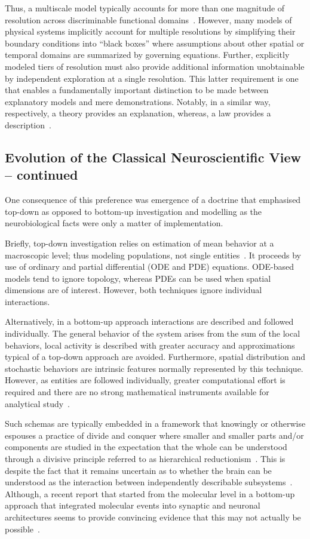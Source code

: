 \documentclass[11pt,3p,twocolumn]{JMN}
\begin{document}
Thus, a multiscale model typically accounts for more than one magnitude of resolution across discriminable functional domains~\citep{walpole13}. However, many models of physical systems implicitly account for multiple resolutions by simplifying their boundary conditions into “black boxes” where assumptions about other spatial or temporal domains are summarized by governing equations. Further, explicitly modeled tiers of resolution must also provide additional information unobtainable by independent exploration at a single resolution. This latter requirement is one that enables a fundamentally important distinction to be made between explanatory models and mere demonstrations. Notably, in a similar way, respectively, a theory provides an explanation, whereas, a law provides a description~\citep{schurger22}.

\subsection{Evolution of the Classical Neuroscientific View -- continued}

One consequence of this preference was emergence of a doctrine that emphasised top-down as opposed to bottom-up investigation and modelling as the neurobiological facts were only a matter of implementation.

Briefly, top-down investigation relies on estimation of mean behavior at a macroscopic level; thus modeling populations, not single entities~\citep{chiacchio14}. It proceeds by use of ordinary and partial differential (ODE and PDE) equations. ODE-based models tend to ignore topology, whereas PDEs can be used when spatial dimensions are of interest. However, both techniques ignore individual interactions.

Alternatively, in a bottom-up approach interactions are described and followed individually. The general behavior of the system arises from the sum of the local behaviors, local activity is described with greater accuracy and approximations typical of a top-down approach are avoided. Furthermore, spatial distribution and stochastic behaviors are intrinsic features normally represented by this technique. However, as entities are followed individually, greater computational effort is required and there are no strong mathematical instruments available for analytical study~\citep{chiacchio14}.

Such schemas are typically embedded in a framework that knowingly or otherwise espouses a practice of divide and conquer where smaller and smaller parts and/or components are studied in the expectation that the whole can be understood through a divisive principle referred to as hierarchical reductionism~\citep{dawkins06}. This is despite the fact that it remains uncertain as to whether the brain can be understood as the interaction between independently describable subsystems~\citep{djurfeldt08}. Although, a recent report that started from the molecular level in a bottom-up approach that integrated molecular events into synaptic and neuronal architectures seems to provide convincing evidence that this may not actually be possible~\citep{bouteiller11}.
\end{document}
